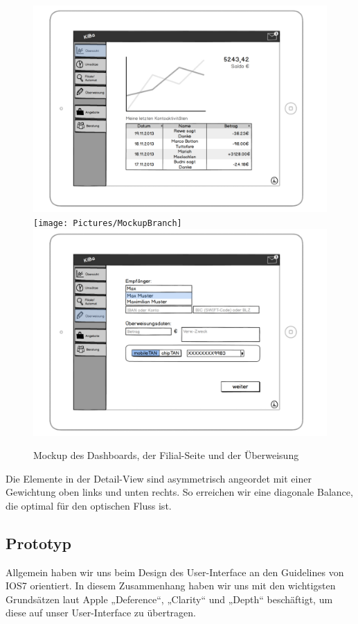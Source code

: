 \begin{figure}[p]
	\centering
	\includegraphics[scale=.52]{Pictures/MockupDashboard}\\
	\texttt{[image: Pictures/MockupBranch]}\\
	\includegraphics[scale=.52]{Pictures/MockupTransition}
	\caption{Mockup des Dashboards, der Filial-Seite und der Überweisung}
\end{figure}

	Die Elemente in der Detail-View sind asymmetrisch angeordet mit einer Gewichtung oben links und unten rechts. So erreichen wir eine diagonale Balance, die optimal für den optischen Fluss ist.

\subsection{Prototyp}
	Allgemein haben wir uns beim Design des User-Interface an den Guidelines von IOS7 orientiert. In diesem Zusammenhang haben wir uns mit den wichtigsten Grundsätzen laut Apple „Deference“, „Clarity“ und „Depth“ beschäftigt, um diese auf unser User-Interface zu übertragen. 
	
